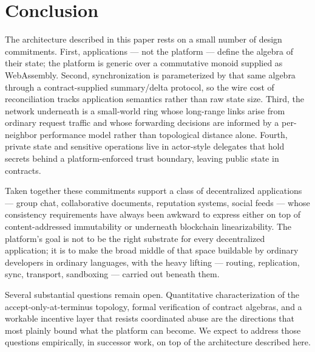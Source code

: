 \section{Conclusion}
\label{sec:conclusion}

The architecture described in this paper rests on a small number of design commitments. First, applications --- not the platform --- define the algebra of their state; the platform is generic over a commutative monoid supplied as WebAssembly. Second, synchronization is parameterized by that same algebra through a contract-supplied summary/delta protocol, so the wire cost of reconciliation tracks application semantics rather than raw state size. Third, the network underneath is a small-world ring whose long-range links arise from ordinary request traffic and whose forwarding decisions are informed by a per-neighbor performance model rather than topological distance alone. Fourth, private state and sensitive operations live in actor-style delegates that hold secrets behind a platform-enforced trust boundary, leaving public state in contracts.

Taken together these commitments support a class of decentralized applications --- group chat, collaborative documents, reputation systems, social feeds --- whose consistency requirements have always been awkward to express either on top of content-addressed immutability or underneath blockchain linearizability. The platform's goal is not to be the right substrate for every decentralized application; it is to make the broad middle of that space buildable by ordinary developers in ordinary languages, with the heavy lifting --- routing, replication, sync, transport, sandboxing --- carried out beneath them.

Several substantial questions remain open. Quantitative characterization of the accept-only-at-terminus topology, formal verification of contract algebras, and a workable incentive layer that resists coordinated abuse are the directions that most plainly bound what the platform can become. We expect to address those questions empirically, in successor work, on top of the architecture described here.
